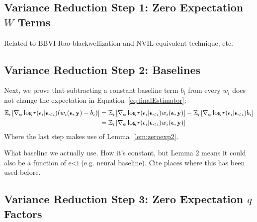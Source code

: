 \subsection{Variance Reduction Step 1: Zero Expectation $W$ Terms}

Related to BBVI Rao-blackwellization and NVIL-equivalent technique, etc.

\subsection{Variance Reduction Step 2: Baselines}

Next, we prove that subtracting a constant baseline term $b_i$ from every $w_i$ does not change the expectation in Equation~\ref{eq:finalEstimator}:
\begin{align*}
\expect_\reparamDist [ \gradparams \log \reparamDist(\reparamVar_i | \reparamVars_{<i}) (w_i(\reparamVars, \observedVars) - b_i) ]
%
&= \expect_\reparamDist [ \gradparams \log \reparamDist(\reparamVar_i | \reparamVars_{<i}) w_i(\reparamVars, \observedVars) ] - \expect_\reparamDist[ \gradparams \log \reparamDist(\reparamVar_i | \reparamVars_{<i}) b_i ]\\
%
&= \expect_\reparamDist [ \gradparams \log \reparamDist(\reparamVar_i | \reparamVars_{<i}) w_i(\reparamVars, \observedVars) ] 
\end{align*}
Where the last step makes use of Lemma~\ref{lem:zeroexp2}.

What baseline we actually use. How it's constant, but Lemma 2 means it could also be a function of e<i (e.g. neural baseline).
Cite places where this has been used before.

\subsection{Variance Reduction Step 3: Zero Expectation $q$ Factors}
